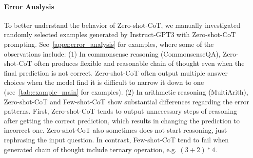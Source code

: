 \documentclass{article}
\newcommand{\kojima}[1]{{\color{red}[{#1} --TK]}}
\newcommand{\yi}[1]{{\color{magenta}[{#1} --YI]}}
\newcommand{\CoT}{chain of thought\xspace}
\newcommand{\ours}{Zero-shot-CoT\xspace}
\newcommand{\theirs}{Few-shot-CoT\xspace}
\begin{document}
\paragraph{Error Analysis}



To better understand the behavior of \ours, we manually investigated randomly selected examples generated by Instruct-GPT3 with \ours prompting. 
See~\autoref{appx:error_analysis} for examples, where some of the observations include: (1) In commonsense reasoning (CommonsenseQA), \ours often produces flexible and reasonable \CoT even when the final prediction is not correct. 
\ours often output multiple answer choices when the model find it is difficult to narrow it down to one (see~\autoref{tab:example_main} for examples). (2) In arithmetic reasoning (MultiArith), \ours and \theirs show substantial differences regarding the error patterns.
First, \ours tends to output unnecessary steps of reasoning after getting the correct prediction, which results in changing the prediction to incorrect one. 
\ours also sometimes does not start reasoning, just rephrasing the input question. 
In contrast, \theirs tend to fail when generated \CoT include ternary operation, e.g. $(3+2)*4$. 


% 
% 
\end{document}
